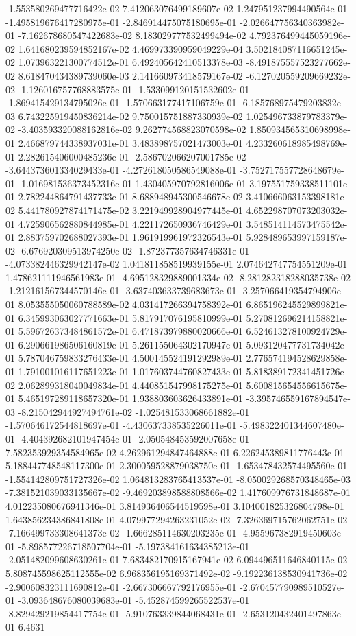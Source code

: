 -1.553580269477716422e-02	7.412063076499189607e-02	1.247951237994490564e-01	-1.495819676417280975e-01	-2.846914475075180695e-01	-2.026647756340363982e-01	-7.162678680547422683e-02	8.183029777532499494e-02	4.792376499445059196e-02	1.641680239594852167e-02	4.469973390959049229e-04	3.502184087116651245e-02	1.073963221300774512e-01	6.492405642410513378e-03	-8.491875557523277662e-02	8.618470434389739060e-03	2.141660973418579167e-02	-6.127020559209669232e-02	-1.126016757768883575e-01	-1.533099120151532602e-01	-1.869415429134795026e-01	-1.570663177417106759e-01	-6.185768975479203832e-03	6.743225919450836214e-02	9.750015751887330939e-02	1.025496733879783379e-02	-3.403593320088162816e-02	9.262774568823070598e-02	1.850934565310698998e-01	2.466879744338937031e-01	3.483898757021473003e-01	4.233260618985498769e-01	2.282615406000485236e-01	-2.586702066207001785e-02	-3.644373601334029433e-01	-4.272618050586549088e-01	-3.752717557728648679e-01	-1.016981536373452316e-01	1.430405970792816006e-01	3.197551759338511101e-01	2.782244864791437733e-01	8.688948945300546678e-02	3.410666063153398181e-02	5.441780927874171475e-02	3.221949928904977445e-01	4.652298707073203032e-01	4.725906562880844985e-01	4.221172650936746429e-01	3.548514114573475542e-01	2.883759702688027393e-01	1.961919961972326543e-01	5.928489653997159187e-02	-6.676920309513974250e-02	-1.872377357634746331e-01	-4.073382446329942147e-02	1.041811858519939155e-01	2.074642747754551209e-01	1.478621111946561983e-01	-4.695128329889001334e-02	-8.281282318288035738e-02	-1.212161567344570146e-01	-3.637403633739683673e-01	-3.257066419354794906e-01	8.053555050060788589e-02	4.031417266394758392e-01	6.865196245529899821e-01	6.345993063027771663e-01	5.817917076195810999e-01	5.270812696214158821e-01	5.596726373484861572e-01	6.471873979880020666e-01	6.524613278100924729e-01	6.290661986506160819e-01	5.261155064302170947e-01	5.093120477731734042e-01	5.787046759833276433e-01	4.500145524191292989e-01	2.776574194528629858e-01	1.791001016117651223e-01	1.017603744760827433e-01	5.818389172341451726e-02	2.062899318040049834e-01	4.440851547998175275e-01	5.600815654556615675e-01	5.465197289118657320e-01	1.938803603626433891e-01	-3.395746559167894547e-03	-8.215042944927494761e-02	-1.025481533068661882e-01	-1.570646172544818697e-01	-4.430637338535226011e-01	-5.498322401344607480e-01	-4.404392682101947454e-01	-2.050548453592007658e-01	7.582353929354584965e-02	4.262961294847464888e-01	6.226245389811776443e-01	5.188447748548117300e-01	2.300059528879038750e-01	-1.653478432574495560e-01	-1.554142809751727326e-02	1.064813283765413537e-01	-8.050029268570348465e-03	-7.381521039033135667e-02	-9.469203898588808566e-02	1.417609976731848687e-01	4.012235080676941346e-01	3.814936406544519598e-01	3.104001825326804798e-01	1.643856234386841808e-01	4.079977294263231052e-02	-7.326369715762062751e-02	-7.166499733308641373e-02	-1.666285114630203235e-01	-4.955967382919450603e-01	-5.898577226718507704e-01	-5.197384161634385213e-01	-2.051482099608630261e-01	7.683482170915167941e-02	6.094496511646840115e-02	5.808745598625112555e-02	6.968356195169371492e-02	-9.192236138530941736e-02	-2.900608323111690812e-01	-2.667306667792176955e-01	-2.670457790989510527e-01	-3.093648676080039683e-01	-5.452874599265522537e-01	-8.829429219854417754e-01	-5.910763339844068431e-01	-2.653120432401497863e-01	6.4631